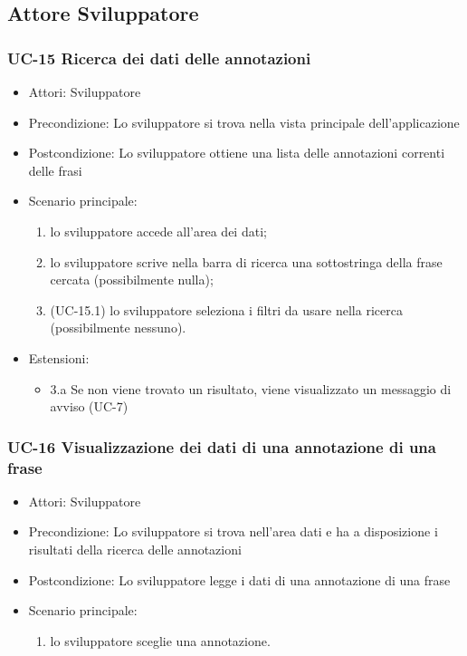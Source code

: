 \subsection{Attore Sviluppatore}

	\subsubsection{UC-15 Ricerca dei dati delle annotazioni}
		\begin{itemize}
			\item Attori: Sviluppatore
			\item Precondizione: Lo sviluppatore si trova nella vista principale dell'applicazione
			\item Postcondizione: Lo sviluppatore ottiene una lista delle annotazioni correnti delle frasi
			\item Scenario principale:
				\begin{enumerate}
					\item lo sviluppatore accede all'area dei dati;
					\item lo sviluppatore scrive nella barra di ricerca una sottostringa della frase cercata (possibilmente nulla);
					\item (UC-15.1) lo sviluppatore seleziona i filtri da usare nella ricerca (possibilmente nessuno).
				\end{enumerate}
			\item Estensioni:
				\begin{itemize}
					\item 3.a Se non viene trovato un risultato, viene visualizzato un messaggio di avviso (UC-7)
				\end{itemize}
		\end{itemize}

	\subsubsection{UC-16 Visualizzazione dei dati di una annotazione di una frase}
		\begin{itemize}
			\item Attori: Sviluppatore
			\item Precondizione: Lo sviluppatore si trova nell'area dati e ha a disposizione i risultati della ricerca delle annotazioni
			\item Postcondizione: Lo sviluppatore legge i dati di una annotazione di una frase
			\item Scenario principale:
				\begin{enumerate}
					\item lo sviluppatore sceglie una annotazione.
				\end{enumerate}
		\end{itemize}
	
